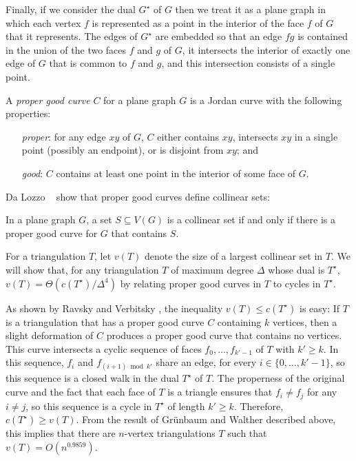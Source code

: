 \documentclass{patmorin}
\newcommand{\dual}[1]{{#1}^\star}
\begin{document}
Finally, if we consider the dual $\dual{G}$ of $G$ then we treat it
as a plane graph in which each vertex $f$ is represented as a point in
the interior of the face $f$ of $G$ that it represents.  The edges of
$\dual{G}$ are embedded so that an edge $fg$ is contained in the union of
the two faces $f$ and $g$ of $G$, it intersects the interior of exactly
one edge of $G$ that is common to $f$ and $g$, and this intersection
consists of a single point.

A \emph{proper good curve} $C$ for a plane graph $G$ is a
Jordan curve with the following properties:
\begin{enumerate}
	\item[\emph{proper}:] for any edge $xy$ of $G$, $C$ either contains $xy$, intersects
  $xy$ in a single point (possibly an endpoint), or is disjoint
  from $xy$; and
  \item[\emph{good}:] $C$ contains at least one point in the interior of
  some face of $G$.
\end{enumerate}

Da Lozzo \etal\ \cite{dalozzo.dujmovic.ea:drawing} show that proper good
curves define collinear sets:

\begin{thm}
  In a plane graph $G$, a set $S\subseteq V(G)$ is a collinear set if
  and only if there is a proper good curve for $G$ that contains $S$.
\end{thm}

For a triangulation $T$, let $v(T)$ denote the size of a largest
collinear set in $T$.  We will show that, for any triangulation $T$
of maximum degree $\Delta$
whose dual is $\dual{T}$, $v(T)=\Theta(c(\dual{T})/\Delta^4)$ by relating proper good curves in $T$ to cycles in $\dual{T}$.

As shown by Ravsky and Verbitsky
\cite{ravsky.verbitsky:on,ravsky.verbitsky:on-arxiv}, the inequality $v(T)
\le c(\dual{T})$ is easy: If $T$ is a triangulation that has a proper
good curve $C$ containing $k$ vertices, then a slight deformation of
$C$ produces a proper good curve that contains no vertices. This curve
intersects a cyclic sequence of faces $f_0,\ldots,f_{k'-1}$ of $T$
with $k'\ge k$.  In this sequence, $f_i$ and $f_{(i+1)\bmod k'}$ share
an edge, for every $i\in\{0,\ldots,k'-1\}$, so this sequence is a closed
walk in the dual $\dual{T}$ of $T$.  The properness of the original curve
and the fact that each face of $T$ is a triangle ensures that $f_i\neq
f_j$ for any $i\neq j$, so this sequence is a cycle in $\dual{T}$ of
length $k'\ge k$.  Therefore, $c(\dual{T})\ge v(T)$. From the result
of Gr\"unbaum and Walther described above, this implies that there are
$n$-vertex triangulations $T$ such that $v(T) = O(n^{0.9859})$.
\end{document}
